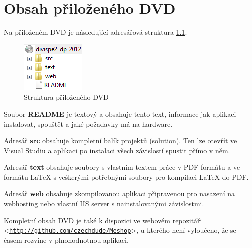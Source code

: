 \documentclass[11pt,twoside,a4paper]{book}
\let\oldUrl\url
\renewcommand\url[1]{<\texttt{\oldUrl{#1}}>}
\begin{document}
\chapter{Obsah přiloženého DVD}

Na přiloženém DVD je následující adresářová struktura \ref{fig:seznamcd}.

\begin{figure}[h]
\begin{center}
\includegraphics[scale=1]{figures/cd}
\caption{Struktura přiloženého DVD}
\label{fig:seznamcd}
\end{center}
\end{figure}

Soubor \textbf{README} je textový a obsahuje tento text, informace jak aplikaci instalovat, spouštět a jaké požadavky má na hardware.

Adresář \textbf{src} obsahuje kompletní balík projektů (solution). Ten lze otevřít ve Visual Studiu a aplikaci po instalaci všech závislostí spustit přímo v něm.

Adresář \textbf{text} obsahuje soubory s vlastním textem práce v PDF formátu a ve formátu {\LaTeX} s veškerými potřebnými soubory pro kompilaci {\LaTeX} do PDF.

Adresář \textbf{web} obsahuje zkompilovanou aplikaci připravenou pro nasazení na webhosting nebo vlastní IIS server s nainstalovanými závislostmi.

Kompletní obsah DVD je také k dispozici ve webovém repozitáři \url{http://github.com/czechdude/Meshop}, u kterého není vyloučeno, že se časem rozvine v plnohodnotnou aplikaci.
\end{document}
